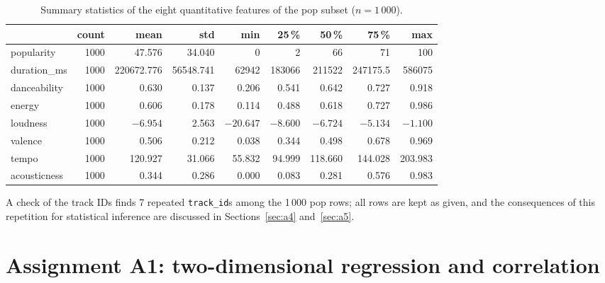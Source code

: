 \documentclass[11pt,letterpaper]{article}
\begin{document}
\begin{table}[H]
\centering
\caption{Summary statistics of the eight quantitative features of the pop
subset ($n=1\,000$).}
\label{tab:popdescribe}
\footnotesize
\setlength{\tabcolsep}{3.5pt}
\begin{tabular}{lrrrrrrrr}
\toprule
 & count & mean & std & min & 25\,\% & 50\,\% & 75\,\% & max \\
\midrule
popularity   & 1000 & 47.576    & 34.040   & 0       & 2       & 66      & 71      & 100 \\
duration\_ms & 1000 & 220672.776 & 56548.741 & 62942  & 183066  & 211522  & 247175.5 & 586075 \\
danceability & 1000 & 0.630     & 0.137    & 0.206   & 0.541   & 0.642   & 0.727   & 0.918 \\
energy       & 1000 & 0.606     & 0.178    & 0.114   & 0.488   & 0.618   & 0.727   & 0.986 \\
loudness     & 1000 & $-6.954$  & 2.563    & $-20.647$ & $-8.600$ & $-6.724$ & $-5.134$ & $-1.100$ \\
valence      & 1000 & 0.506     & 0.212    & 0.038   & 0.344   & 0.498   & 0.678   & 0.969 \\
tempo        & 1000 & 120.927   & 31.066   & 55.832  & 94.999  & 118.660 & 144.028 & 203.983 \\
acousticness & 1000 & 0.344     & 0.286    & 0.000   & 0.083   & 0.281   & 0.576   & 0.983 \\
\bottomrule
\end{tabular}
\end{table}

A check of the track IDs finds 7 repeated \texttt{track\_id}s among the
1\,000 pop rows; all rows are kept as given, and the consequences of this
repetition for statistical inference are discussed in Sections~\ref{sec:a4}
and~\ref{sec:a5}.

\section{Assignment A1: two-dimensional regression and correlation}\label{sec:a1}
\end{document}
